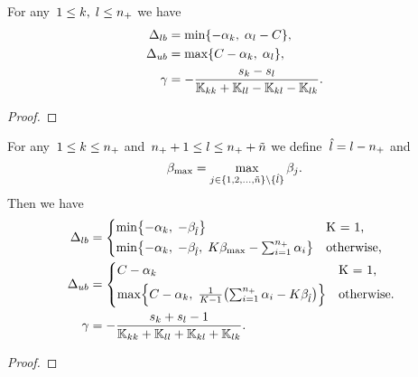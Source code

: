 \begin{lemma}
  For any~$1 \le k,\; l \le n_{+}$ we have
  \begin{align*}
    \Delta_{lb} & = \min\{- \alpha_k,\; \alpha_l - C\}, \\
    \Delta_{ub} & = \max\{C - \alpha_k,\; \alpha_l \}, \\
    \gamma      & = -\frac{s_k - s_l}{\mathbb{K}_{kk} + \mathbb{K}_{ll} - \mathbb{K}_{kl} - \mathbb{K}_{lk}}.
  \end{align*}
\end{lemma}

\begin{proof}
\end{proof}

\begin{lemma}
  For any~$1 \le k \le n_{+}$ and~$n_{+} + 1 \le l \le n_{+} + \tilde{n}$ we define~$\hat{l} = l - n_{+}$ and
  \begin{equation*}
    \beta_{\max} = \max_{j \in \{1, 2, \ldots, \tilde{n} \} \setminus \{\hat{l}\}} \beta_j.
  \end{equation*}
  Then we have
  \begin{align*}
    \Delta_{lb} & = 
      \begin{cases*}
        \min \Brac[c]{- \alphak,\;  -\betal} & K = 1, \\
        \min \Brac[c]{- \alphak,\;  -\betal, \; K\beta_{\max} - \sum_{i = 1}^{\npos} \alpha_i} & \textrm{otherwise},
      \end{cases*} \\
    \Delta_{ub} & = 
      \begin{cases*}
          C - \alphak & K = 1, \\
          \max \Brac[c]{C - \alphak, \; \frac{1}{K-1}\Brac{\sum_{i = 1}^{\npos} \alpha_i - K \betal}}  & \textrm{otherwise}.
      \end{cases*} \\
    \gamma & = - \frac{s_k + s_l - 1}{\K_{kk} + \K_{ll} + \K_{kl} + \K_{lk}}.
  \end{align*}
\end{lemma}

\begin{proof}
\end{proof}

